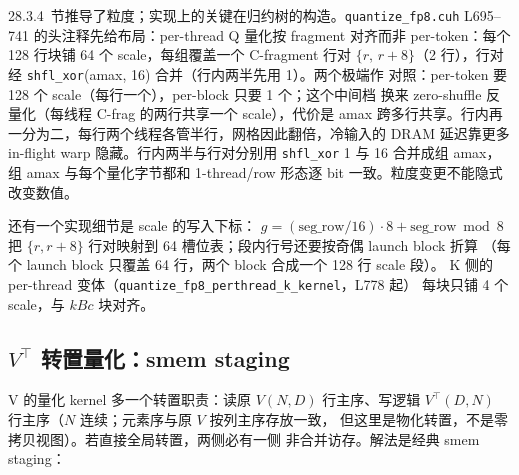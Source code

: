 28.3.4~节推导了粒度；实现上的关键在归约树的构造。\texttt{quantize\_fp8.cuh}
L695--741 的头注释先给布局：per-thread Q 量化按 fragment 对齐而非
per-token：每个 128 行块铺 64 个 scale，每组覆盖一个 C-fragment 行对
$\{r,\,r{+}8\}$（2 行），行对经 \texttt{shfl\_xor}(amax, 16) 合并（行内两半先用 1）。两个极端作
对照：per-token 要 128 个 scale（每行一个），per-block 只要 1 个；这个中间档
换来 zero-shuffle 反量化（每线程 C-frag 的两行共享一个 scale），代价是 amax
跨多行共享。行内再一分为二，每行两个线程各管半行，网格因此翻倍，冷输入的
DRAM 延迟靠更多 in-flight warp 隐藏。行内两半与行对分别用 \texttt{shfl\_xor}
1 与 16 合并成组 amax，组 amax 与每个量化字节都和 1-thread/row 形态逐 bit
一致。粒度变更不能隐式改变数值。

还有一个实现细节是 scale 的写入下标：
$g = (\text{seg\_row}/16)\cdot 8 + \text{seg\_row}\bmod 8$
把 $\{r, r+8\}$ 行对映射到 64 槽位表；段内行号还要按奇偶 launch block 折算
（每个 launch block 只覆盖 64 行，两个 block 合成一个 128 行 scale 段）。
K 侧的 per-thread 变体（\texttt{quantize\_fp8\_perthread\_k\_kernel}，L778 起）
每块只铺 4 个 scale，与 $kBc$ 块对齐。

\subsection{$V^{\top}$ 转置量化：smem staging}\label{sec:28-quant-vt}

V 的量化 kernel 多一个转置职责：读原 $V(N,D)$ 行主序、写逻辑
$V^{\top}(D,N)$ 行主序（$N$ 连续；元素序与原 $V$ 按列主序存放一致，
但这里是物化转置，不是零拷贝视图）。若直接全局转置，两侧必有一侧
非合并访存。解法是经典 smem staging：

